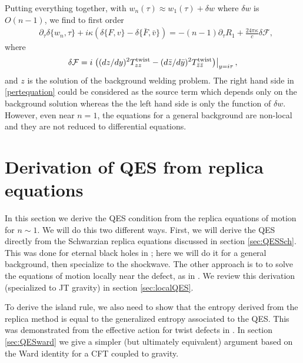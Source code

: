 \documentclass[12pt]{article}
\newcommand{\p}{\partial}
\newcommand{\f}{\frac}
\let\l=\lambda \let\m=\mu \let\n=\nu \let\x=\xi \let\p=\phi \let\r=v
\let\f=\frac
\let\pa=\partial
\def\ba{\begin{eqnarray}}
\def\ea{\end{eqnarray}}
\renewcommand{\p}{\partial}
\numberwithin{equation}{section}
\def\m{{\mu}}
\def\n{{\nu}}
\def\p{{\phi}}
\newcommand{\bz}{\bar{z}}
\def\ba{\begin{eqnarray}}
\def\ea{\end{eqnarray}}
\def\r{\rightarrow}
\def\f {\frac}
\def\l{\left}
\def\r{\right}
\def\x{\bar{x}}
\renewcommand{\p}{\partial}
\newcommand{\by}{\bar{y}}
\begin{document}
\begin{spacing}{1.1}
Putting everything together, with $w_n (\tau) \approx w_1(\tau) + \delta w$ where $\delta w$ is $O(n-1)$, we find to first order 
\begin{align}\label{pertequation}
& \pa_\tau \delta \{ w_n,\tau\} + i \kappa (\delta \{F, v\} - \delta \{ \bar{F},\bar{v} \} )  = - (n-1)\pa_\tau R_1 + \f{24 \pi \kappa}{c} \delta \mathcal{F} , 
\end{align}
where   
\ba \delta {\cal F}=  i  \l. \l( (dz/dy)^2  T_{zz}^{\rm twist}   - (d\bz/d\by)^2 T_{\bz \bz}^{\rm twist}    \r) \r|_{y= i \tau} ,
\ea
and $z$ is the solution of the background welding problem. The right hand side in \eqref{pertequation} could be considered as the source term which depends only on the background solution whereas the the left hand side is only the function of $\delta w$. However, even near $n=1$, the equations for a general background are non-local and they are not reduced to differential equations.



\section{Derivation of QES from replica equations}\label{sec:qesreplica}

In this section we derive the QES condition from the replica equations of motion for $n \sim 1$. We will do this two different ways. First, we will derive the QES directly from the Schwarzian replica equations discussed in section \ref{sec:QESSch}. This was done for eternal black holes in \cite{Almheiri:2019qdq,Penington:2019kki}; here we will do it for a general background, then specialize to the shockwave. The other approach is to to solve the equations of motion locally near the defect, as in \cite{Lewkowycz:2013nqa, Dong:2017xht}. We review this derivation (specialized to JT gravity) in section \ref{sec:localQES}.

To derive the island rule, we also need to show that the entropy derived from the replica method is equal to the generalized entropy associated to the QES. This was demonstrated from the effective action for twist defects in \cite{Almheiri:2019qdq,Penington:2019kki}. In section \ref{sec:QESward} we give a simpler (but ultimately equivalent) argument based on the  Ward identity for a CFT coupled to gravity.



\end{spacing}
\end{document}

